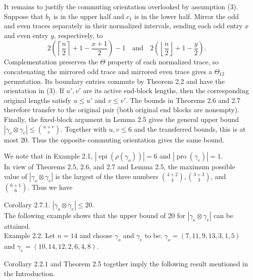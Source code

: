 \documentclass[10pt]{article}
\begin{document}
It remains to justify the commuting orientation overlooked by assumption (3). Suppose that $b_{1}$ is in the upper half and $c_{1}$ is in the lower half. Mirror the odd and even traces separately in their normalized intervals, sending each odd entry $x$ and even entry $y$, respectively, to
\[
2\left(\left\lceil\frac n2\right\rceil+1-\frac{x+1}{2}\right)-1
\quad\text{and}\quad
2\left(\left\lfloor\frac n2\right\rfloor+1-\frac y2\right).
\]
Complementation preserves the $\Theta$ property of each normalized trace, so concatenating the mirrored odd trace and mirrored even trace gives a $\Theta_{12}$ permutation. Its boundary entries commute by Theorem 2.2 and have the orientation in (3). If $u',v'$ are its active end-block lengths, then the corresponding original lengths satisfy $u\leq u'$ and $v\leq v'$. The bounds in Theorems 2.6 and 2.7 therefore transfer to the original pair (both original end blocks are nonempty). Finally, the fixed-block argument in Lemma 2.5 gives the general upper bound $\left|\gamma_o\otimes\gamma_e\right|\leq\binom{u+v}{v}$. Together with $u,v\leq6$ and the transferred bounds, this is at most $20$. Thus the opposite commuting orientation gives the same bound.

We note that in Example 2.1, $\left|\operatorname{epi}\left(\rho\left(\gamma_{o}\right)\right)\right|=6$ and $\left|\operatorname{pro}\left(\gamma_{e}\right)\right|=1$.\\
In view of Theorems 2.5, 2.6, and 2.7 and Lemma 2.5, the maximum possible value of $\left|\gamma_{o} \otimes \gamma_{e}\right|$ is the largest of the three numbers $\binom{4+2}{4},\binom{3+3}{3}$, and $\binom{6+1}{6}$. Thus we have

Corollary 2.7.1. $\left|\gamma_{o} \otimes \gamma_{e}\right| \leq 20$.\\
The following example shows that the upper bound of 20 for $\left|\gamma_{o} \otimes \gamma_{e}\right|$ can be attained.\\
Example 2.2. Let $n=14$ and choose $\gamma_{o}$ and $\gamma_{e}$ to be: $\gamma_{o}=(7,11,9,13,3,1,5)$ and $\gamma_{e}=(10,14,12,2,6,4,8)$.

Corollary 2.2.1 and Theorem 2.5 together imply the following result mentioned in the Introduction.
\end{document}
